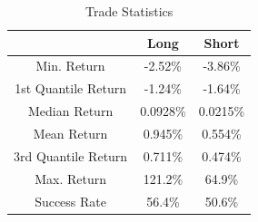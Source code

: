 \documentclass[12pt]{article}
\theoremstyle{definition}
\begin{document}
\begin{table}[ht]
\centering
\begin{tabular}{|c| c |c|} 
 \hline
 &Long & Short \\
 \hline
 Min. Return& -2.52\%& -3.86\%\\
1st Quantile Return& -1.24\% & -1.64\%\\
 Median Return& 0.0928\% & 0.0215\% \\
  Mean Return& 0.945\% & 0.554\% \\
 3rd Quantile Return & 0.711\% & 0.474\%\\
 Max. Return& 121.2\% & 64.9\%\\
 Success Rate& 56.4\% & 50.6\% \\ 
 \hline
\end{tabular}
\caption{Trade Statistics}
\label{table:2}
\end{table}
\end{document}
